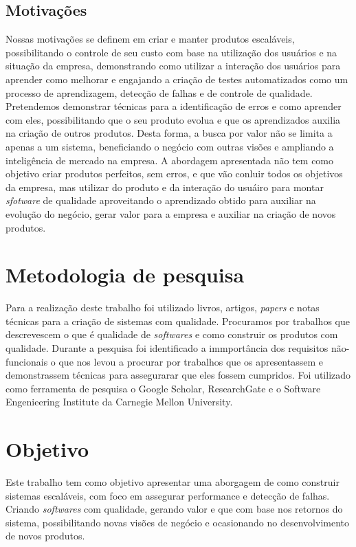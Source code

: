     \section{Motivações}
      Nossas motivações se definem em criar e manter produtos escaláveis,
      possibilitando o controle de seu custo com base na utilização
      dos usuários e na situação da empresa, demonstrando como utilizar a interação
      dos usuários para aprender como melhorar e engajando a criação de testes
      automatizados como um processo de aprendizagem, detecção de falhas e de
      controle de qualidade. \newline
      Pretendemos demonstrar técnicas para a identificação de erros e como
      aprender com eles, possibilitando que o seu produto evolua e que os
      aprendizados auxilia na criação de outros produtos. Desta forma, a busca
      por valor não se limita a apenas a um sistema, beneficiando o negócio com
      outras visões e ampliando a inteligência de mercado na empresa. A abordagem
      apresentada não tem como objetivo criar produtos perfeitos, sem erros, e
      que vão conluir todos os objetivos da empresa, mas utilizar do produto e da
      interação do usuáiro para montar \textit{sfotware} de qualidade aproveitando
      o aprendizado obtido para auxiliar na evolução do negócio, gerar valor para
      a empresa e auxiliar na criação de novos produtos.

  \chapter{Metodologia de pesquisa}
    Para a realização deste trabalho foi utilizado livros, artigos, \textit{papers}
    e notas técnicas para a criação de sistemas com qualidade. Procuramos por trabalhos
    que descrevescem o que é qualidade de \textit{softwares} e como construir os
    produtos com qualidade. Durante a pesquisa foi identificado a immportância dos
    requisitos não-funcionais o que nos levou a procurar por trabalhos que os
    apresentassem e demonstrassem técnicas para assegurarar que eles fossem
    cumpridos. \newline
    Foi utilizado como ferramenta de pesquisa o Google Scholar, ResearchGate e o
    Software Engenieering Institute da Carnegie Mellon University.

  \chapter{Objetivo}
    Este trabalho tem como objetivo apresentar uma aborgagem de como construir
    sistemas escaláveis, com foco em assegurar performance e detecção de falhas.
    Criando \textit{softwares} com qualidade, gerando valor e que com base nos
    retornos do sistema, possibilitando novas visões de negócio e ocasionando no
    desenvolvimento de novos produtos.
